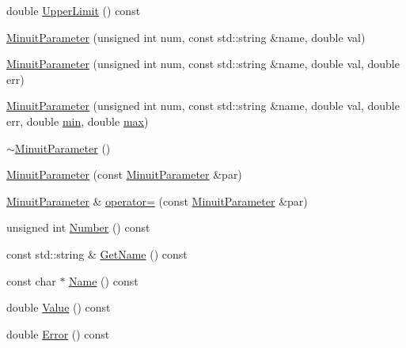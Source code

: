 \begin{DoxyCompactItemize}
\item 
double \mbox{\hyperlink{classROOT_1_1Minuit2_1_1MinuitParameter_a285e254a9574807222d2a74bb05e18d9}{Upper\+Limit}} () const
\item 
\mbox{\hyperlink{classROOT_1_1Minuit2_1_1MinuitParameter_afa9a57b4990491316502a21e09b756bc}{Minuit\+Parameter}} (unsigned int num, const std\+::string \&name, double val)
\item 
\mbox{\hyperlink{classROOT_1_1Minuit2_1_1MinuitParameter_a56d290ba2abc3c599cff99187329a91a}{Minuit\+Parameter}} (unsigned int num, const std\+::string \&name, double val, double err)
\item 
\mbox{\hyperlink{classROOT_1_1Minuit2_1_1MinuitParameter_a13b433906347405bf85ef2bdf5803990}{Minuit\+Parameter}} (unsigned int num, const std\+::string \&name, double val, double err, double \mbox{\hyperlink{adat__devel_2lib_2SU3_2SU3__internal_8h_ab0f5fed3171eb00d1c5f037d9f518a23}{min}}, double \mbox{\hyperlink{adat__devel_2lib_2SU3_2SU3__internal_8h_ace7f45ceb252a2dfbf29b98bc81cb8ba}{max}})
\item 
\mbox{\hyperlink{classROOT_1_1Minuit2_1_1MinuitParameter_a487d895f06a46c8c2e1e3dbc97dd0a26}{$\sim$\+Minuit\+Parameter}} ()
\item 
\mbox{\hyperlink{classROOT_1_1Minuit2_1_1MinuitParameter_a0ac95809b18c619597764fcfabcb70fe}{Minuit\+Parameter}} (const \mbox{\hyperlink{classROOT_1_1Minuit2_1_1MinuitParameter}{Minuit\+Parameter}} \&par)
\item 
\mbox{\hyperlink{classROOT_1_1Minuit2_1_1MinuitParameter}{Minuit\+Parameter}} \& \mbox{\hyperlink{classROOT_1_1Minuit2_1_1MinuitParameter_ae26eba9113194d198e988d7c87057398}{operator=}} (const \mbox{\hyperlink{classROOT_1_1Minuit2_1_1MinuitParameter}{Minuit\+Parameter}} \&par)
\item 
unsigned int \mbox{\hyperlink{classROOT_1_1Minuit2_1_1MinuitParameter_aaa2361c2954576d90a0dffcf2e049eea}{Number}} () const
\item 
const std\+::string \& \mbox{\hyperlink{classROOT_1_1Minuit2_1_1MinuitParameter_adc67abcb32783aed362068ee38cb24b7}{Get\+Name}} () const
\item 
const char $\ast$ \mbox{\hyperlink{classROOT_1_1Minuit2_1_1MinuitParameter_a151958b5dbcc194a090753e0b2605fbc}{Name}} () const
\item 
double \mbox{\hyperlink{classROOT_1_1Minuit2_1_1MinuitParameter_ac77aed82006ba9e9598df49a1753d31c}{Value}} () const
\item 
double \mbox{\hyperlink{classROOT_1_1Minuit2_1_1MinuitParameter_af92997a2e9a7209fbddd286bbd1dbc3d}{Error}} () const

\end{DoxyCompactItemize}
